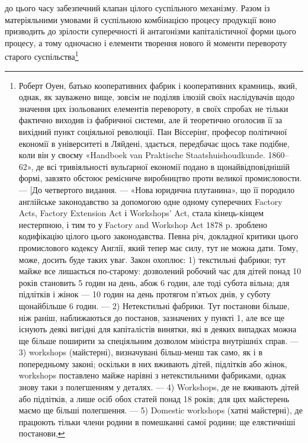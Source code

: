 \parcont{}  %
до цього часу забезпечний клапан цілого суспільного
механізму. Разом із матеріяльними умовами й суспільною комбінацією
процесу продукції воно призводить до зрілости суперечності
й антагонізми капіталістичної форми цього процесу,
а тому одночасно і елементи творення нового й моменти перевороту
старого суспільства\footnote{
Роберт Оуен, батько кооперативних фабрик і кооперативних
крамниць, який, однак, як зауважено вище, зовсім не поділяв ілюзій
своїх наслідувачів щодо значення цих ізольованих елементів перевороту,
в своїх спробах не тільки фактично виходив із фабричної системи,
але й теоретично оголосив її за вихідний пункт соціяльної революції.
Пан Віссерінґ, професор політичної економії в університеті в Ляйдені,
здається, передбачає щось таке подібне, коли він у своєму «Handboek
van Praktische Staatshuishoudkunde. 1860--62», де всі тривіяльності
вульґарної економії подано в щонайвідповіднішій формі, завзято обстоює
ремісниче виробництво проти великої промисловости. — [До четвертого видання.
— «Нова юридична плутанина», що її породило англійське законодавство
за допомогою одне одному суперечних Factory Acts, Factory
Extension Act і Workshops’ Act, стала кінець-кінцем нестерпною, і
тим то у Factory and Workshop Act 1878 p. зроблено кодифікацію цілого
цього законодавства. Певна річ, докладної критики цього промислового
кодексу Англії, який тепер має силу, тут не можна дати. Тому, може,
досить буде таких уваг. Закон охоплює: 1) текстильні фабрики; тут
майже все лишається по-старому: дозволений робочий час для дітей
понад 10 років становить 5 годин на день, абож 6 годин, але тоді субота
вільна; для підлітків і жінок — 10 годин на день протягом п’ятьох
днів, у суботу щонайбільше 6 годин. — 2) Нетекстильні фабрики. Тут
постанови більше, ніж раніш, наближаються до постанов, зазначених у
пункті 1, але все ще існують деякі вигідні для капіталістів винятки, які
в деяких випадках можна ще більше поширити за спеціяльним дозволом
міністра внутрішніх справ. — 3) workshops (майстерні), визначувані
більш-менш так само, як і в попередньому законі; оскільки в них вживають
дітей, підлітків або жінок, workshops поставлено майже нарівні
з нетекстильними фабриками, однак знову таки з полегшенням у деталях.
— 4) Workshops, де не вживають дітей або підлітків, а лише осіб
обох статей понад 18 років; для цих майстерень маємо ще більші полегшення.
— 5) Domestic workshops (хатні майстерні), де працюють тільки
члени родини в помешканні самої родини; ще елястичніші постанови,
}

